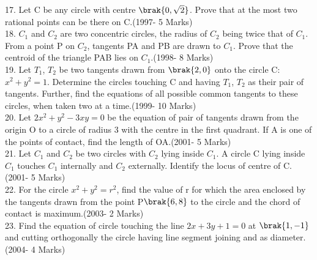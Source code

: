 \documentclass[journal,12pt,twocolumn]{IEEEtran}
\theoremstyle{remark}
\begin{document}
17. Let C be any circle with centre $\brak{0,\sqrt{2}}$. Prove that at the most two rational points can be there on C.\hfill(1997- 5 Marks)\\




18. $C_{1}$ and $C_{2}$ are two concentric circles, the radius of $C_{2}$ being twice that of $C_{1}$. From a point P on $C_{2}$, tangents PA and PB are drawn to $C_{1}$. Prove that the centroid of the triangle PAB lies on $C_{1}$.\hfill(1998- 8 Marks)\\




19. Let $T_{1}$, $T_{2}$ be two tangents drawn from $\brak{2,0}$ onto the circle C:$x^2+y^2=1$. Determine the circles touching C and having $T_{1}$, $T_{2}$ as their pair of tangents. Further, find the equations of all possible common tangents to these circles, when taken two at a time.\hfill(1999- 10 Marks)\\




20. Let $2x^2+y^2-3xy=0$ be the equation of pair of tangents drawn from the origin O to a circle of radius 3 with the centre in the first quadrant. If A is one of the points of contact, find the length of OA.\hfill(2001- 5 Marks)\\




21. Let $C_{1}$ and $C_{2}$ be two circles with $C_{2}$ lying inside $C_{1}$. A circle C lying inside $C_{1}$ touches $C_{1}$ internally and $C_{2}$ externally. Identify the locus of centre of C.\hfill(2001- 5 Marks)\\





22. For the circle $x^2+y^2=r^2$, find the value of r for which the area enclosed by the tangents drawn from the point P$\brak{6,8}$ to the circle and the chord of contact is maximum.\hfill(2003- 2 Marks)\\ 





23. Find the equation of circle touching the line $2x+3y+1=0$ at $\brak{1,-1}$ and cutting orthogonally the circle having line segment joining  and  as diameter.\hfill(2004- 4 Marks)\\     
\end{document}
